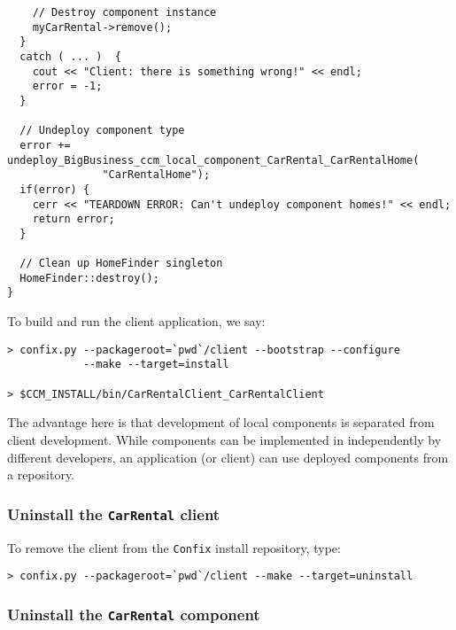 \begin{small}
\begin{verbatim}
    // Destroy component instance
    myCarRental->remove();
  } 
  catch ( ... )  {
    cout << "Client: there is something wrong!" << endl;
    error = -1;
  }

  // Undeploy component type
  error += undeploy_BigBusiness_ccm_local_component_CarRental_CarRentalHome(
               "CarRentalHome");
  if(error) {
    cerr << "TEARDOWN ERROR: Can't undeploy component homes!" << endl;
    return error;
  }

  // Clean up HomeFinder singleton
  HomeFinder::destroy();
}
\end{verbatim}
\end{small}

To build and run the client application, we say:
\begin{small}
\begin{verbatim}
> confix.py --packageroot=`pwd`/client --bootstrap --configure 
            --make --target=install

> $CCM_INSTALL/bin/CarRentalClient_CarRentalClient
\end{verbatim}
\end{small}

The advantage here is that development of local components is separated from
client development. 
While components can be implemented in independently by different developers, an
application (or client) can use deployed components from a repository.


\subsubsection{Uninstall the {\tt CarRental} client}

To remove the client from the {\tt Confix} install repository, type:

\begin{small}
\begin{verbatim}
> confix.py --packageroot=`pwd`/client --make --target=uninstall
\end{verbatim}
\end{small}




\subsubsection{Uninstall the {\tt CarRental} component}

